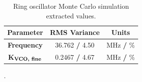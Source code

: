 	\begin{table}[htb!]
		\def\arraystretch{1.5}		
		\setlength\arrayrulewidth{0.75pt}
		\setlength{\tabcolsep}{1em} %
		\begin{tabular}{|c|c|c|}
			\hline 
			\rule[-1ex]{0pt}{2.5ex} \cellcolor{gray!40}\textbf{Parameter} & \cellcolor{gray!40}\textbf{RMS Variance} & \cellcolor{gray!40}\textbf{Units}\\ 
			\hline 
			\rule[-1ex]{0pt}{2.5ex} \textbf{Frequency}&  36.762 \textbf{/} {\color{blue}4.50} &  MHz \textbf{/} {\color{blue}\%}  \\ 
			\hline 
			\rule[-1ex]{0pt}{2.5ex} \textbf{K$_\textnormal{\textbf{VCO, fine}}$} &  0.2467 \textbf{/} {\color{blue}4.67} &  MHz \textbf{/} {\color{blue}\%}  \\ 
			\hline 
		\end{tabular} 
		\caption{Ring oscillator Monte Carlo simulation extracted values.}
		\label{tab:mc_results}
	\end{table}

	{\color{white}.}
	\FloatBarrier\pagebreak
